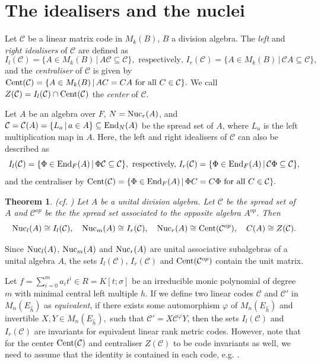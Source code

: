 \documentclass[12pt]{amsart}
\theoremstyle{plain}
\newtheorem{theorem}{Theorem}[section]
\theoremstyle{definition}
\numberwithin{equation}{section}
\numberwithin{figure}{section}
\begin{document}
\section{The idealisers and the nuclei}\label{sec:nuc}

Let $\mathcal{C}$ be a linear matrix code in $M_k(B)$, $B$ a division algebra.
The \textit{left} and \textit{right idealisers} of $\mathcal{C}$ are defined as
$$I_l(\mathcal{C})=\lbrace A\in M_k(B)\,|\, A\mathcal{C}\subseteq\mathcal{C}\rbrace, \text{ respectively, }
I_r(\mathcal{C})=\lbrace A\in M_k(B)\,|\, \mathcal{C}A\subseteq\mathcal{C}\rbrace,$$
and the \textit{centraliser} of $\mathcal{C}$ is given by
${\rm Cent}(\mathcal{C})=\lbrace A\in M_k(B)\,|\, A C=C A\text{ for all } C\in \mathcal{C}\rbrace.$ We call
$Z(\mathcal{C})=I_l(\mathcal{C})  \cap{\rm Cent}(\mathcal{C})$ the \textit{center} of $\mathcal{C}$.


Let $A$ be an algebra over $F$, $N={\rm Nuc}_r(A)$, and
$\mathcal{C}=\mathcal{C}(A)=\lbrace L_a \,|\,a\in A\rbrace\subseteq {\rm End}_{N}(A)$
 be the spread set of  $A$, where $L_a$ is the left multiplication map in $A$. Here, the left and right idealisers of $\mathcal{C}$ can also be described as
$$I_l(\mathcal{C})=\lbrace \Phi\in {\rm End}_F(A)\,|\, \Phi\mathcal{C}\subseteq\mathcal{C}\rbrace, \text{ respectively, }
I_r(\mathcal{C})=\lbrace \Phi\in {\rm End}_F(A)\,|\, \mathcal{C}\Phi\subseteq\mathcal{C}\rbrace,$$
and the centraliser  by
${\rm Cent}(\mathcal{C})=\lbrace \Phi\in {\rm End}_{F}(A)\,|\, \Phi C=C\Phi \text{ for all } C\in \mathcal{C}\rbrace.$



\begin{theorem}(cf. \cite[Theorem 27]{PT}) 
 \label{Nucleus of Sheekey algebras}
Let $A$ be a unital division algebra. Let  $\mathcal{C}$ be the spread set of $A$ and $\mathcal{C}^{op}$ be the the spread set associated to the opposite algebra $A^{op}$.
Then
$${\rm Nuc}_l(A)\cong I_l(\mathcal{C}),\quad {\rm Nuc}_m(A)\cong I_r(\mathcal{C}),\quad
{\rm Nuc}_r(A)\cong {\rm Cent}(\mathcal{C}^{op}),\quad C(A)\cong Z(\mathcal{C}).$$
\end{theorem}

Since ${\rm Nuc}_l(A)$, ${\rm Nuc}_m(A)$ and ${\rm Nuc}_r(A)$ are unital associative subalgebras of a unital algebra $A$, the sets
$I_l(\mathcal{C})$, $I_r(\mathcal{C})$ and ${\rm Cent}(\mathcal{C}^{op})$ contain the unit matrix.

Let  $f=\sum_{i=0}^ma_it^i\in R=K[t;\sigma]$ be an irreducible monic polynomial of degree $m$  with minimal central left multiple $h$.
 If we define two linear codes $\mathcal{C}$ and $\mathcal{C}'$ in $M_n( E_{\hat{h}})$ as \emph{equivalent}, if there exists some automorphism $\varphi$ of $M_n( E_{\hat{h}})$
and invertible $X,Y\in M_n( E_{\hat{h}}),$ such that $\mathcal{C}'= X \mathcal{C}^\varphi Y$, then the sets $I_l(\mathcal{C})$ and $I_r(\mathcal{C})$ are invariants for equivalent linear rank metric codes. However, note that for the center ${\rm Cent}(\mathcal{C})$ and centraliser $Z(\mathcal{C})$ to
be code invariants as well, we need to assume that the identity is contained in each code, e.g. \cite[Proposition 4.4]{NewS}.
\end{document}
